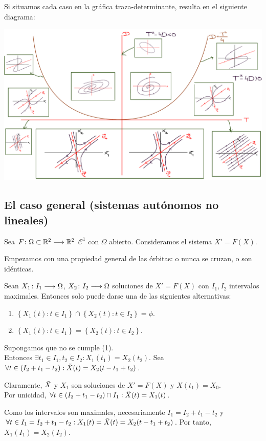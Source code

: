 Si situamos cada caso en la gráfica traza-determinante, resulta en el siguiente diagrama:
\begin{center}
	\includegraphics[width=16.5cm]{img/Plano_Traza-Determinante.png}
\end{center}


\subsection{El caso general (sistemas autónomos no lineales)}

Sea $F \colon \Omega\subset \mathbb{R}^2 \longrightarrow \mathbb{R}^2$ $\mathcal{C}^1$ con $\Omega$ abierto. Consideramos el sistema $\boxed{X'=F(X)}$.

Empezamos con una propiedad general de las órbitas: o nunca se cruzan, o son idénticas.

\begin{prop}
	Sean $X_1 \colon I_1 \longrightarrow \Omega$, $X_2 \colon I_2 \longrightarrow \Omega$ soluciones de $X'=F(X)$ con $I_1, I_2$ intervalos maximales. Entonces solo puede darse una de las siguientes alternativas:
	\begin{enumerate}
		\item $\left\{X_1(t) : t\in I_1\right\} \cap \left\{X_2(t) : t\in I_2\right\} = \phi$.
		\item $\left\{X_1(t) : t\in I_1\right\} = \left\{X_2(t) : t\in I_2\right\}$.
	\end{enumerate}
	\begin{dem}
		Supongamos que no se cumple (1). \\
		Entonces $\exists t_1 \in I_1, t_2 \in I_2 : X_1(t_1) = X_2(t_2)$. Sea $\forall t \in (I_2 +t_1 - t_2) : \tilde{X}(t) = X_2(t-t_1 +t_2)$.

		Claramente, $\Tilde{X}$ y $X_1$ son soluciones de $X'=F(X)$ y $X(t_1) = X_0$. \\
		Por unicidad, $\forall t \in (I_2 + t_1 - t_2) \cap I_1 : \tilde{X}(t) = X_1(t)$.

		Como los intervalos son maximales, necesariamente $I_1 = I_2 + t_1 - t_2$ y \\
		$\forall t \in I_1 = I_2 + t_1 - t_2 : X_1(t) = \tilde{X}(t) = X_2(t - t_1 + t_2)$. Por tanto, $X_1(I_1) = X_2(I_2)$.
	\end{dem}
\end{prop}

